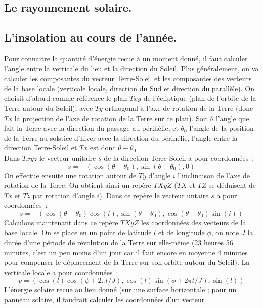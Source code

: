 \documentclass[a4paper,11pt]{article}
\begin{document}
\begin{giacjshere}
\section{Le rayonnement solaire.} \label{sec:soleil}

\subsection{L'insolation au cours de l'ann\'ee.} 
Pour connaitre la quantit\'e d'\'energie recue \`a un moment
donn\'e, il faut calculer l'angle entre la verticale du lieu
et la direction du Soleil. Plus g\'en\'eralement, on va calculer
les composantes du vecteur Terre-Soleil et les composantes
des vecteurs de la base locale (verticale locale, direction du Sud et
direction du parall\`ele). On choisit d'abord comme r\'ef\'erence
le plan $Txy$ de l'\'ecliptique (plan de l'orbite de la Terre
autour du Soleil), avec $Ty$ orthogonal \`a l'axe de rotation 
de la Terre (donc $Tx$ la projection de l'axe de rotation
de la Terre sur ce plan). Soit $\theta$ l'angle que fait la Terre
avec la direction du passage au p\'erih\'elie, et $\theta_0$
l'angle de la position de la Terre au solstice d'hiver avec la
direction du p\'erih\'elie, l'angle entre la direction Terre-Soleil
et $Tx$ est donc $\theta-\theta_0$\\
Dans $Txyz$ le vecteur unitaire $s$
de la direction Terre-Soleil a pour coordonn\'ees~:
\[ s=-(\cos(\theta-\theta_0),\sin(\theta-\theta_0),0)\]
On effectue ensuite une rotation autour
de $Ty$ d'angle $i$ l'inclinaison de l'axe de rotation de la Terre.
On obtient ainsi un rep\`ere $TXyZ$ ($TX$ et $TZ$ se déduisent de 
$Tx$ et $Tz$ par rotation d'angle $i$). Dans ce repère 
le vecteur untaire $s$ a pour coordonnées~:
\[ s=-(\cos(\theta-\theta_0)\cos(i),\sin(\theta-\theta_0),
\cos(\theta-\theta_0)\sin(i)) \]
Calculons maintenant dans ce rep\`ere $TXyZ$ les coordonn\'ees
des vecteurs de la base locale. On se place en un point de latitude
$l$ et de longitude $\phi$, on note $J$ la dur\'ee d'une p\'eriode
de r\'evolution de la Terre sur elle-m\^eme (23 heures 56 minutes,
c'est un peu moins d'un jour car il faut encore en moyenne 4 minutes
pour compenser le d\'eplacement de la Terre sur son orbite autour
du Soleil). La verticale locale a pour coordonn\'ees~:
\[ v=(\cos(l)\cos(\phi+2\pi t/J),\cos(l)\sin(\phi+2\pi t/J),\sin(l))
\]
L'\'energie solaire recue au lieu donn\'e (sur une surface horizontale ;
pour un panneau solaire, il faudrait calculer les coordonn\'ees d'un vecteur

\end{giacjshere}
\end{document}
